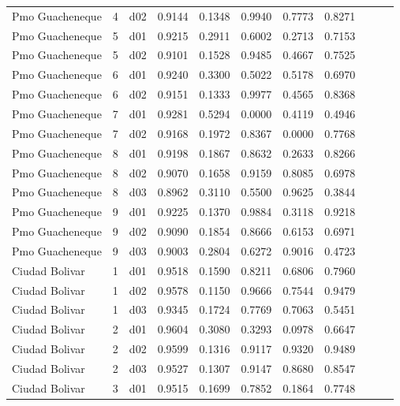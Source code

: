 \begin{landscape}
\begin{longtable}{p{5cm}rrrrrrrrrr}
      Pmo Guacheneque  & 4 &     d02 &   0.9144 &  0.1348 &    0.9940 &   0.7773 &    0.8271 \\
      Pmo Guacheneque  & 5 &     d01 &   0.9215 &  0.2911 &    0.6002 &   0.2713 &    0.7153 \\
      Pmo Guacheneque  & 5 &     d02 &   0.9101 &  0.1528 &    0.9485 &   0.4667 &    0.7525 \\
      Pmo Guacheneque  & 6 &     d01 &   0.9240 &  0.3300 &    0.5022 &   0.5178 &    0.6970 \\
      Pmo Guacheneque  & 6 &     d02 &   0.9151 &  0.1333 &    0.9977 &   0.4565 &    0.8368 \\
      Pmo Guacheneque  & 7 &     d01 &   0.9281 &  0.5294 &    0.0000 &   0.4119 &    0.4946 \\
      Pmo Guacheneque  & 7 &     d02 &   0.9168 &  0.1972 &    0.8367 &   0.0000 &    0.7768 \\
      Pmo Guacheneque  & 8 &     d01 &   0.9198 &  0.1867 &    0.8632 &   0.2633 &    0.8266 \\
      Pmo Guacheneque  & 8 &     d02 &   0.9070 &  0.1658 &    0.9159 &   0.8085 &    0.6978 \\
      Pmo Guacheneque  & 8 &     d03 &   0.8962 &  0.3110 &    0.5500 &   0.9625 &    0.3844 \\
      Pmo Guacheneque  & 9 &     d01 &   0.9225 &  0.1370 &    0.9884 &   0.3118 &    0.9218 \\
      Pmo Guacheneque  & 9 &     d02 &   0.9090 &  0.1854 &    0.8666 &   0.6153 &    0.6971 \\
      Pmo Guacheneque  & 9 &     d03 &   0.9003 &  0.2804 &    0.6272 &   0.9016 &    0.4723 \\
       Ciudad Bolivar  & 1 &     d01 &   0.9518 &  0.1590 &    0.8211 &   0.6806 &    0.7960 \\
       Ciudad Bolivar  & 1 &     d02 &   0.9578 &  0.1150 &    0.9666 &   0.7544 &    0.9479 \\
       Ciudad Bolivar  & 1 &     d03 &   0.9345 &  0.1724 &    0.7769 &   0.7063 &    0.5451 \\
       Ciudad Bolivar  & 2 &     d01 &   0.9604 &  0.3080 &    0.3293 &   0.0978 &    0.6647 \\
       Ciudad Bolivar  & 2 &     d02 &   0.9599 &  0.1316 &    0.9117 &   0.9320 &    0.9489 \\
       Ciudad Bolivar  & 2 &     d03 &   0.9527 &  0.1307 &    0.9147 &   0.8680 &    0.8547 \\
       Ciudad Bolivar  & 3 &     d01 &   0.9515 &  0.1699 &    0.7852 &   0.1864 &    0.7748 \\

\end{longtable}
\end{landscape}
